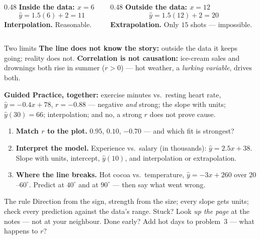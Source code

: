 \documentclass[aspectratio=169, 11pt]{beamer}
\begin{document}
\begin{frame}[t, plain]
  \begin{columns}[T]
    \begin{column}{0.48\textwidth}
      \textbf{Inside the data: $x=6$}
      \[ \hat y = 1.5(6)+2 = 11 \]
      \textbf{Interpolation.} Reasonable.
    \end{column}
    \begin{column}{0.48\textwidth}
      \textbf{Outside the data: $x=12$}
      \[ \hat y = 1.5(12)+2 = 20 \]
      \textbf{Extrapolation.} Only $15$ shots --- impossible.
    \end{column}
  \end{columns}
  \vspace{3pt}
  \begin{block}{Two limits}
    \textbf{The line does not know the story:} outside the data it keeps going; reality does not.
    \textbf{Correlation is not causation:} ice-cream sales and drownings both rise in summer
    ($r>0$) --- hot weather, a \emph{lurking variable}, drives both.
  \end{block}
  \vspace{3pt}
  \textbf{Guided Practice, together:} exercise minutes vs.\ resting heart rate, $\hat y=-0.4x+78$,
  $r=-0.88$ --- negative \emph{and} strong; the slope with units; $\hat y(30)=66$; interpolation;
  and no, a strong $r$ does not prove cause.
\end{frame}

\begin{frame}[t, plain]
  \begin{enumerate}\setlength{\itemsep}{6pt}
    \item \textbf{Match $r$ to the plot.} $0.95$, $0.10$, $-0.70$ --- and which fit is strongest?
    \item \textbf{Interpret the model.} Experience vs.\ salary (in thousands):
          $\hat y=2.5x+38$. Slope with units, intercept, $\hat y(10)$, and interpolation or
          extrapolation.
    \item \textbf{Where the line breaks.} Hot cocoa vs.\ temperature, $\hat y=-3x+260$ over
          $20$--$60^\circ$. Predict at $40^\circ$ and at $90^\circ$ --- then say what went wrong.
  \end{enumerate}
  \vspace{5pt}
  \begin{block}{The rule}
    Direction from the sign, strength from the size; every slope gets units; check every
    prediction against the data's range. Stuck? Look \emph{up the page} at the notes --- not at
    your neighbour. Done early? Add hot days to problem~3 --- what happens to $r$?
  \end{block}
\end{frame}
\end{document}

